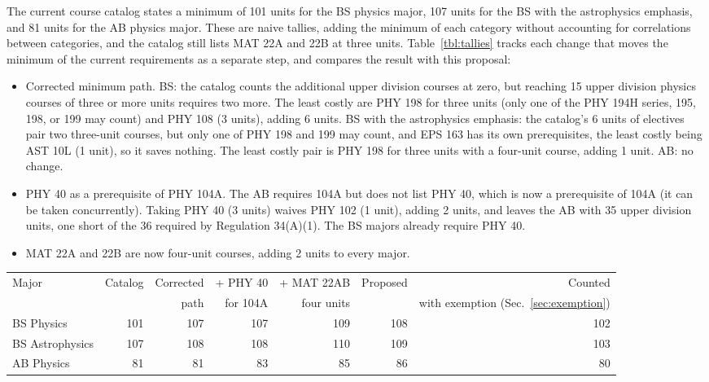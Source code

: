 \documentclass[12pt]{article}
\begin{document}
The current course catalog states a minimum of 101 units for the BS
physics major, 107 units for the BS with the astrophysics emphasis,
and 81 units for the AB physics major.  These are naive tallies,
adding the minimum of each category without accounting for
correlations between categories, and the catalog still lists MAT 22A
and 22B at three units.  Table~\ref{tbl:tallies} tracks each change
that moves the minimum of the current requirements as a separate
step, and compares the result with this proposal:
\begin{itemize}
\item Corrected minimum path.  BS:  the catalog counts the additional
  upper division courses at zero, but reaching 15 upper division
  physics courses of three or more units requires two more.  The least
  costly are PHY 198 for three units (only one of the PHY 194H series,
  195, 198, or 199 may count) and PHY 108 (3 units), adding 6 units.
  BS with the astrophysics emphasis:  the catalog's 6 units of
  electives pair two three-unit courses, but only one of PHY 198 and
  199 may count, and EPS 163 has its own prerequisites, the least
  costly being AST 10L (1 unit), so it saves nothing.  The least
  costly pair is PHY 198 for three units with a four-unit course,
  adding 1 unit.  AB:  no change.
\item PHY 40 as a prerequisite of PHY 104A.  The AB requires 104A but
  does not list PHY 40, which is now a prerequisite of 104A (it can be
  taken concurrently).  Taking PHY 40 (3 units) waives PHY 102 (1
  unit), adding 2 units, and leaves the AB with 35 upper division
  units, one short of the 36 required by Regulation 34(A)(1).  The BS
  majors already require PHY 40.
\item MAT 22A and 22B are now four-unit courses, adding 2 units to
  every major.
\end{itemize}

\noindent
\vskip 0.25cm
\begin{center}
\begin{tabular}{|l|r|r|r|r|r|r|}
\hline
Major & Catalog & Corrected & + PHY 40 & + MAT 22AB & Proposed & Counted\\
      &         & path      & for 104A & four units &          & with exemption (Sec.~\ref{sec:exemption})\\
\hline
BS Physics       & 101 & 107 & 107 & 109 & 108 & 102 \\
BS Astrophysics  & 107 & 108 & 108 & 110 & 109 & 103 \\
AB Physics       &  81 &  81 &  83 &  85 &  86 &  80 \\
\hline
\end{tabular}
\end{center}
\end{document}
